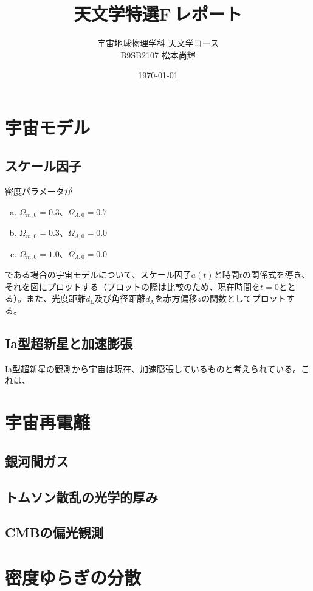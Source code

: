 \documentclass[a4paper,papersize,uplatex,dvipdfmx,10pt]{jsarticle}
\title{天文学特選F\,レポート}
\author{宇宙地球物理学科\,\,天文学コース\\B9SB2107\,\,松本尚輝}
\date{\today}
\begin{document}
\maketitle
\section{宇宙モデル}
\subsection{スケール因子}
密度パラメータが
\begin{enumerate}[(a)]
  \item $\Omega_{m,0}=0.3$、$\Omega_{\Lambda,0}=0.7$
  \item $\Omega_{m,0}=0.3$、$\Omega_{\Lambda,0}=0.0$
  \item $\Omega_{m,0}=1.0$、$\Omega_{\Lambda,0}=0.0$
\end{enumerate}
である場合の宇宙モデルについて、スケール因子$a(t)$と時間$t$の関係式を導き、それを図にプロットする（プロットの際は比較のため、現在時間を$t=0$ととる）。また、光度距離$d_{\mathrm{L}}$及び角径距離$d_{\mathrm{A}}$を赤方偏移$z$の関数としてプロットする。



\subsection{Ia型超新星と加速膨張}
Ia型超新星の観測から宇宙は現在、加速膨張しているものと考えられている。これは、

\section{宇宙再電離}
\subsection{銀河間ガス}


\subsection{トムソン散乱の光学的厚み}

\subsection{CMBの偏光観測}

\section{密度ゆらぎの分散}
\end{document}
